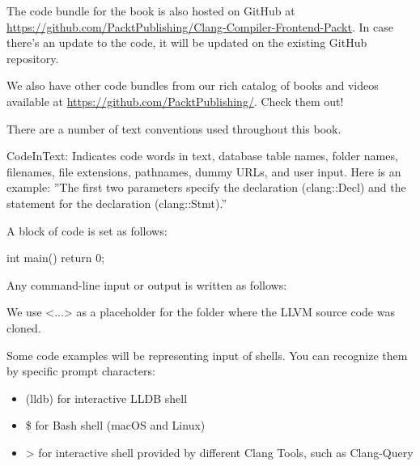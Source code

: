 
The code bundle for the book is also hosted on GitHub at \url{https://github.com/PacktPublishing/Clang-Compiler-Frontend-Packt}. In case there’s an update to the code, it will be updated on the existing GitHub repository.

We also have other code bundles from our rich catalog of books and videos available at \url{https://github.com/PacktPublishing/}. Check them out!



There are a number of text conventions used throughout this book.

CodeInText: Indicates code words in text, database table names, folder names, filenames, file extensions, pathnames, dummy URLs, and user input. Here is an example: ”The first two parameters specify the declaration (clang::Decl) and the statement for the declaration (clang::Stmt).”

A block of code is set as follows:

\begin{cpp}
int main() {
  return 0;
 }
\end{cpp}

Any command-line input or output is written as follows:


We use <...> as a placeholder for the folder where the LLVM source code was cloned.

Some code examples will be representing input of shells. You can recognize them by specific prompt characters:


\begin{itemize}
\item
(lldb) for interactive LLDB shell

\item
\$ for Bash shell (macOS and Linux)

\item
> for interactive shell provided by different Clang Tools, such as Clang-Query
\end{itemize}




